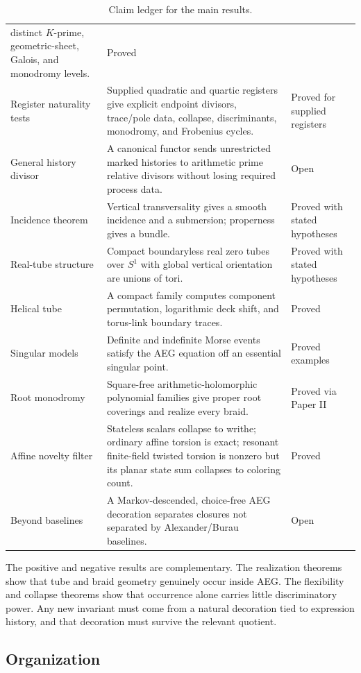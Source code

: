 \begin{table}[p]
\begin{tabular}{p{}p{}p{}}
distinct $K$-prime, geometric-sheet, Galois, and monodromy levels. & Proved \\
Register naturality tests & Supplied quadratic and quartic registers give explicit
endpoint divisors, trace/pole data, collapse, discriminants, monodromy, and
Frobenius cycles. & Proved for supplied registers \\
General history divisor & A canonical functor sends unrestricted marked histories
to arithmetic prime relative divisors without losing required process data. & Open \\
Incidence theorem & Vertical transversality gives a smooth incidence and a
submersion; properness gives a bundle. & Proved with stated hypotheses \\
Real-tube structure & Compact boundaryless real zero tubes over $S^1$ with global
vertical orientation are unions of tori. & Proved with stated hypotheses \\
Helical tube & A compact family computes component permutation, logarithmic deck
shift, and torus-link boundary traces. & Proved \\
Singular models & Definite and indefinite Morse events satisfy the AEG equation
off an essential singular point. & Proved examples \\
Root monodromy & Square-free arithmetic-holomorphic polynomial families give
proper root coverings and realize every braid. & Proved via Paper II \\
Affine novelty filter & Stateless scalars collapse to writhe; ordinary affine
torsion is exact; resonant finite-field twisted torsion is nonzero but its planar
state sum collapses to coloring count. & Proved \\
Beyond baselines & A Markov-descended, choice-free AEG decoration separates
closures not separated by Alexander/Burau baselines. & Open \\
\bottomrule
\end{tabular}
\caption{Claim ledger for the main results.}
\label{tab:claim-ledger}
\end{table}

The positive and negative results are complementary.  The realization theorems
show that tube and braid geometry genuinely occur inside AEG.  The flexibility and
collapse theorems show that occurrence alone carries little discriminatory power.
Any new invariant must come from a natural decoration tied to expression history,
and that decoration must survive the relevant quotient.

\subsection{Organization}

